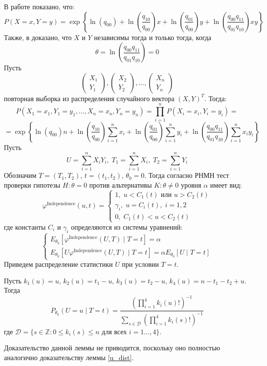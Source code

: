 В работе \cite{Dai2013} показано, что:
$$
P(X=x,Y=y)= \exp \left\{\ln(q_{00}) + 
     \ln \left(\dfrac{q_{10}}{q_{00}}\right) x
    +  \ln \left(\dfrac{q_{01}}{q_{00}}\right) y +
     \ln\left(\dfrac{q_{00}q_{11}}{q_{01}q_{10}}\right) xy
 \right\}
$$
Также, в \cite{Dai2013} доказано, что 
$X$ и $Y$ независимы тогда и только тогда, когда
$$\theta=\ln\left(\dfrac{q_{00}q_{11}}{q_{01}q_{10}}\right)=0$$
Пусть
    $$
        \begin{pmatrix}
            X_1 \\
            Y_1 
        \end{pmatrix},
        \begin{pmatrix}
            X_2 \\
            Y_2
        \end{pmatrix}, \ldots,
        \begin{pmatrix}
            X_n \\
            Y_n
        \end{pmatrix}
    $$ повторная выборка из распределения случайного вектора $(X,Y)^T$. Тогда:
$$
    P(X_1=x_1,Y_1=y_1,\ldots,X_n=x_n,Y_n=y_n)
    =\prod_{i=1}^n P(X_i=x_i,Y_i=y_i) =
    $$
    $$
    =\exp \left\{ \ln(q_{00})n + 
        \ln \left(\dfrac{q_{10}}{q_{00}}\right) \sum_{i=1}^n x_i 
        +\ln \left(\dfrac{q_{01}}{q_{00}}\right) \sum_{i=1}^{n} y_i   +
        \ln\left(\dfrac{q_{00}q_{11}}{q_{01}q_{10}}\right) \sum_{i=1}^n x_i y_i 
     \right\}
    $$
    Пусть 
    $$
    U = \sum_{i=1}^n X_i Y_i,\;
    T_1 = \sum_{i=1}^n X_i,\;
    T_2 = \sum_{i=1}^n Y_i
    $$
    Обозначим $T=(T_1,T_2)$, $t=(t_1,t_2)$, $\theta_0=0$.
    Тогда согласно \cite{Lehmann1986} РНМН тест проверки гипотезы $H: \theta = 0$ против альтернативы $K: \theta \neq 0$ 
    уровня $\alpha$ имеет вид:
    $$
    \varphi^{\text{Independence}}(u,t)=\begin{cases}
        1, \; u<C_1(t) \text{ или } u>C_2(t)\\
        \gamma_i, \; u=C_i(t), \; i=1,2\\
        0, \; C_1(t)<u<C_2(t)
    \end{cases}
    $$
    где константы $C_i$ и $\gamma_i$ определяются из системы уравнений:
    $$
    \begin{cases}
        E_{\theta_0}[\varphi^{\text{Independence}}(U,T) \mid T=t]=\alpha \\
        E_{\theta_0}[U\varphi^{\text{Independence}}(U,T) \mid T=t]=\alpha E_{\theta_0}[U \mid T=t]
    \end{cases}
    $$
    Приведем распределение статистики $U$ при условии $T=t$.
\begin{lemma}
    Пусть $k_1(u)=u$, $k_2(u)=t_1-u$, $k_3(u)=t_2-u$,
    $k_4(u)=n-t_1-t_2+u$.
        Тогда
        $$P_{\theta_0}(U=u \mid T=t)=\dfrac{(\prod_{i=1}^4 k_i(u)!)^{-1}}
            {\sum_{s\in \mathcal{D}} (\prod_{i=1}^4 k_i(s)!)^{-1}}$$
        где $\mathcal{D}=\{s \in \mathbb{Z}: 0\leq k_i(s) \leq n \text{ для всех } i=1\ldots,4\}$.
\end{lemma}
Доказательство данной леммы не приводится, поскольку оно полностью 
аналогично доказательству леммы \ref{u_dist}.

